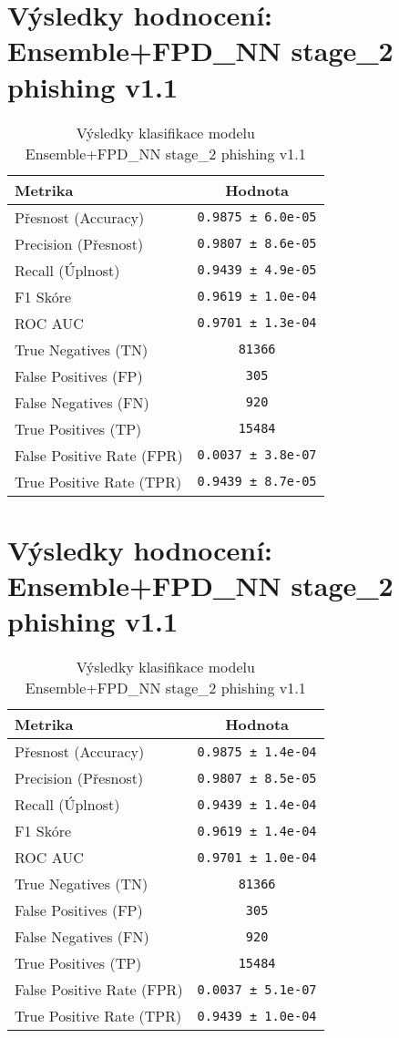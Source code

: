 \section*{Výsledky hodnocení: Ensemble+FPD_NN stage_2 phishing v1.1}
\begin{table}[h!]
\centering
\begin{tabular}{|l|c|}
\hline
\textbf{Metrika} & \textbf{Hodnota} \\
\hline
Přesnost (Accuracy) & \texttt{0.9875 ± 6.0e-05} \\
Precision (Přesnost) & \texttt{0.9807 ± 8.6e-05} \\
Recall (Úplnost) & \texttt{0.9439 ± 4.9e-05} \\
F1 Skóre & \texttt{0.9619 ± 1.0e-04} \\
ROC AUC & \texttt{0.9701 ± 1.3e-04} \\
True Negatives (TN) & \texttt{81366} \\
False Positives (FP) & \texttt{305} \\
False Negatives (FN) & \texttt{920} \\
True Positives (TP) & \texttt{15484} \\
False Positive Rate (FPR) & \texttt{0.0037 ± 3.8e-07} \\
True Positive Rate (TPR) & \texttt{0.9439 ± 8.7e-05} \\
\hline
\end{tabular}
\caption{Výsledky klasifikace modelu Ensemble+FPD_NN stage_2 phishing v1.1}
\label{tab:phishing_ensemble+fpd_nn}
\end{table}

\section*{Výsledky hodnocení: Ensemble+FPD_NN stage_2 phishing v1.1}
\begin{table}[h!]
\centering
\begin{tabular}{|l|c|}
\hline
\textbf{Metrika} & \textbf{Hodnota} \\
\hline
Přesnost (Accuracy) & \texttt{0.9875 ± 1.4e-04} \\
Precision (Přesnost) & \texttt{0.9807 ± 8.5e-05} \\
Recall (Úplnost) & \texttt{0.9439 ± 1.4e-04} \\
F1 Skóre & \texttt{0.9619 ± 1.4e-04} \\
ROC AUC & \texttt{0.9701 ± 1.0e-04} \\
True Negatives (TN) & \texttt{81366} \\
False Positives (FP) & \texttt{305} \\
False Negatives (FN) & \texttt{920} \\
True Positives (TP) & \texttt{15484} \\
False Positive Rate (FPR) & \texttt{0.0037 ± 5.1e-07} \\
True Positive Rate (TPR) & \texttt{0.9439 ± 1.0e-04} \\
\hline
\end{tabular}
\caption{Výsledky klasifikace modelu Ensemble+FPD_NN stage_2 phishing v1.1}
\label{tab:phishing_ensemble+fpd_nn}
\end{table}

